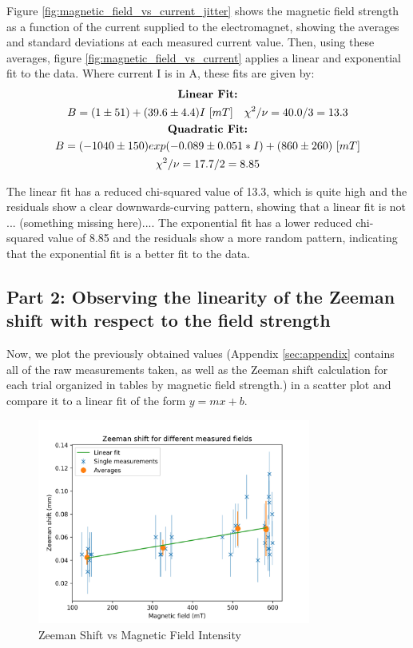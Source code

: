 Figure \ref{fig:magnetic_field_vs_current_jitter} shows the magnetic field strength as a function of the current supplied to the electromagnet, showing the averages and standard deviations at each measured current value. Then, using these averages, figure \ref{fig:magnetic_field_vs_current} applies a linear and exponential fit to the data. Where current I is in A, these fits are given by:
\begin{gather*}
    \text{\textbf{Linear Fit:}} \\
    B = (1 \pm 51) + (39.6 \pm 4.4)I~[mT] \quad \chi^2 / \nu = 40.0 / 3 = 13.3 \\
    \text{\textbf{Quadratic Fit:}} \\
    B = (-1040 \pm 150) exp (-0.089 \pm 0.051 * I) + (860 \pm 260)~[mT] \\
    \chi^2 / \nu = 17.7 / 2 = 8.85
\end{gather*}


The linear fit has a reduced chi-squared value of 13.3, which is quite high and the residuals show a clear downwards-curving pattern, showing that a linear fit is not ... (something missing here).... The exponential fit has a lower reduced chi-squared value of 8.85 and the residuals show a more random pattern, indicating that the exponential fit is a better fit to the data.

\subsection{Part 2: Observing the linearity of the Zeeman shift with respect to the field strength}

Now, we plot the previously obtained values (Appendix \ref{sec:appendix} contains all of the raw measurements taken, as well as the Zeeman shift calculation for each trial organized in tables by magnetic field strength.)
in a scatter plot and compare it to a linear fit of the form $y = mx + b$.

\begin{figure}
    \centering
    \includegraphics[width=0.8\textwidth]{Results/img/zeeman_shift_scatter.png}
    \caption{Zeeman Shift vs Magnetic Field Intensity}
    \label{fig:zeeman_shift_scatter}
\end{figure}

